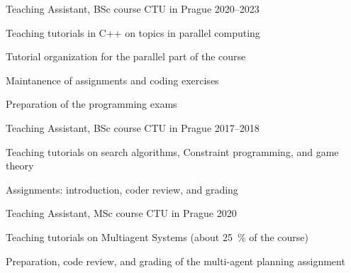

\begin{cventries}


  \cventry
    {Teaching Assistant, BSc course} %
    {} %
    {CTU in Prague} %
    {2020--2023} %
    {
      \begin{cvitems} %
        \item {Teaching tutorials in C++ on topics in parallel computing}
        \item {Tutorial organization for the parallel part of the course}
        \item {Maintanence of assignments and coding exercises}
        \item {Preparation of the programming exams}
      \end{cvitems}
    }

  \cventry
  {Teaching Assistant, BSc course} %
  {} %
  {CTU in Prague} %
  {2017--2018} %
  {
    \begin{cvitems} %
      \item {Teaching tutorials on search algorithms, Constraint programming, and game theory}
      \item {Assignments: introduction, coder review, and grading}
    \end{cvitems}
  }

  \cventry
  {Teaching Assistant, MSc course} %
  {} %
  {CTU in Prague} %
  {2020} %
  {
    \begin{cvitems} %
      \item{Teaching tutorials on Multiagent Systems (about \SI{25}{\percent} of the course)}
      \item {Preparation, code review, and grading of the multi-agent planning assignment}
    \end{cvitems}
  }

\end{cventries}
    

